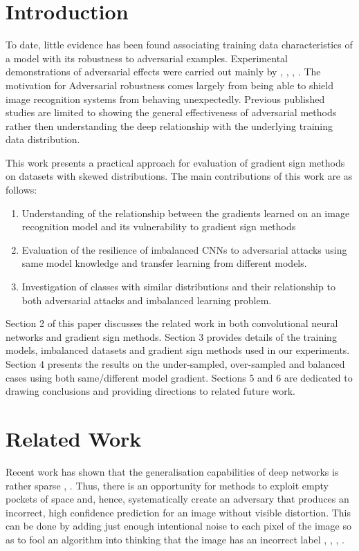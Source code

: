 \documentclass[runningheads,a4paper]{llncs}
\begin{document}
\section{Introduction}

To date, little evidence has been found associating training data characteristics of a model with its robustness to adversarial examples. Experimental demonstrations of adversarial effects were carried out mainly by \cite{billovits}, \cite{goodfellow2014}, \cite{goodfellow2016}, \cite{papernot2016}. The motivation for Adversarial robustness comes largely from being able to shield image recognition systems from behaving unexpectedly. Previous published studies are limited to showing the general effectiveness of adversarial methods rather then understanding the deep relationship with the underlying training data distribution.

This work presents a practical approach for evaluation of gradient sign methods on datasets with skewed distributions. The main contributions of this work are as follows:
\begin{enumerate}
\item Understanding of the relationship between the gradients learned on an image recognition model and its vulnerability to gradient sign methods
\item Evaluation of the resilience of imbalanced CNNs to adversarial attacks using same model knowledge and transfer learning from different models.
\item Investigation of classes with similar distributions and their relationship to both adversarial attacks and imbalanced learning problem.
\end{enumerate}

Section 2 of this paper discusses the related work in both convolutional neural networks and gradient sign methods. Section 3 provides details of the training models, imbalanced datasets and gradient sign methods used in our experiments. Section 4 presents the results on the under-sampled, over-sampled and balanced cases using both same/different model gradient. Sections 5 and 6 are dedicated to drawing conclusions and providing directions to related future work.


\section{Related Work}

Recent work has shown that the generalisation capabilities of deep networks is rather sparse \cite{goodfellow2016}, \cite{papernot2016transf}. Thus, there is an opportunity for methods to exploit empty pockets of space and, hence, systematically create an adversary that produces an incorrect, high confidence prediction for an image without visible distortion. This can be done by adding just enough intentional noise to each pixel of the image so as to fool an algorithm into thinking that the image has an incorrect label \cite{goodfellow2014}, \cite{goodfellow2016}, \cite{papernot2016transf}, \cite{szegedy2013}.
\end{document}
